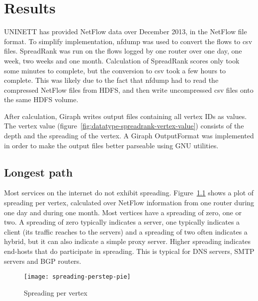 \chapter{Results}
\label{chp:results}

UNINETT has provided NetFlow data over December 2013, in the NetFlow file format.
To simplify implementation, \gls{nfdump} was used to convert the flows to \gls{csv} files.
SpreadRank was run on the flows logged by one router over one day, one week, two weeks and one month.
Calculation of SpreadRank scores only took some minutes to complete,
 but the conversion to \gls{csv} took a few hours to complete.
This was likely due to the fact that \gls{nfdump} had to read the compressed NetFlow files from \gls{HDFS},
 and then write uncompressed \gls{csv} files onto the same HDFS volume.

After calculation, \gls{Giraph} writes output files containing all vertex IDs as values.
The vertex value (figure~\ref{fig:datatype-spreadrank-vertex-value}) consists of the depth and the spreading of the vertex.
A Giraph OutputFormat was implemented in order to make the output files better parseable using GNU utilities.

\section{Longest path}
Most \gls{service}s on the internet do not exhibit spreading.
Figure~\ref{fig:spreading-perstep-pie} shows a plot of spreading per vertex, calculated over NetFlow information from one router during one day and during one month.
Most vertices have a spreading of zero, one or two.
A spreading of zero typically indicates a server, one typically indicates a client (its traffic reaches to the servers) and a spreading of two often indicates a hybrid, but it can also indicate a simple proxy server.
Higher spreading indicates end-hosts that do participate in spreading.
This is typical for DNS servers, SMTP servers and BGP routers.

\begin{figure}[h!]
	\caption{Spreading per vertex}
	\label{fig:spreading-perstep-pie}
	\centering
		\texttt{[image: spreading-perstep-pie]}
\end{figure}


